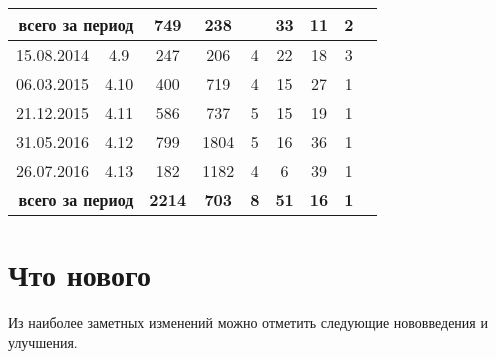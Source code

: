 \documentclass[10pt, a5paper]{article}
\begin{document}
{\begin{turn}{90}
\begin{tabular}{lllllllll}
\multicolumn{2}{|r|}{\textbf{всего за период}}                 & \multicolumn{1}{c|}{\textbf{749}}  & \multicolumn{1}{c|}{\textbf{238}} & \multicolumn{1}{c|}{\textbf{}}  & \multicolumn{1}{c|}{\textbf{33}} & \multicolumn{1}{c|}{\textbf{11}} & \multicolumn{1}{c|}{\textbf{2}} \\ \hline
\multicolumn{1}{|c|}{15.08.2014} & \multicolumn{1}{c|}{4.9}    & \multicolumn{1}{c|}{247}           & \multicolumn{1}{c|}{206}          & \multicolumn{1}{c|}{4}          & \multicolumn{1}{c|}{22}          & \multicolumn{1}{c|}{18}          & \multicolumn{1}{c|}{3}          \\ \hline
\multicolumn{1}{|c|}{06.03.2015} & \multicolumn{1}{c|}{4.10}   & \multicolumn{1}{c|}{400}           & \multicolumn{1}{c|}{719}          & \multicolumn{1}{c|}{4}          & \multicolumn{1}{c|}{15}          & \multicolumn{1}{c|}{27}          & \multicolumn{1}{c|}{1}          \\ \hline
\multicolumn{1}{|c|}{21.12.2015} & \multicolumn{1}{c|}{4.11}   & \multicolumn{1}{c|}{586}           & \multicolumn{1}{c|}{737}          & \multicolumn{1}{c|}{5}          & \multicolumn{1}{c|}{15}          & \multicolumn{1}{c|}{19}          & \multicolumn{1}{c|}{1}          \\ \hline
\multicolumn{1}{|c|}{31.05.2016} & \multicolumn{1}{c|}{4.12}   & \multicolumn{1}{c|}{799}           & \multicolumn{1}{c|}{1804}         & \multicolumn{1}{c|}{5}          & \multicolumn{1}{c|}{16}          & \multicolumn{1}{c|}{36}          & \multicolumn{1}{c|}{1}          \\ \hline
\multicolumn{1}{|c|}{26.07.2016} & \multicolumn{1}{c|}{4.13}   & \multicolumn{1}{c|}{182}           & \multicolumn{1}{c|}{1182}         & \multicolumn{1}{c|}{4}          & \multicolumn{1}{c|}{6}           & \multicolumn{1}{c|}{39}          & \multicolumn{1}{c|}{1}          \\ \hline
\multicolumn{2}{|r|}{\textbf{всего за период}}                 & \multicolumn{1}{c|}{\textbf{2214}} & \multicolumn{1}{c|}{\textbf{703}} & \multicolumn{1}{c|}{\textbf{8}} & \multicolumn{1}{c|}{\textbf{51}} & \multicolumn{1}{c|}{\textbf{16}} & \multicolumn{1}{c|}{\textbf{1}} \\ \hline
\end{tabular}
\end{turn}
}
\section*{Что нового}

Из наиболее заметных изменений можно отметить следующие нововведения и
улучшения.
\end{document}
